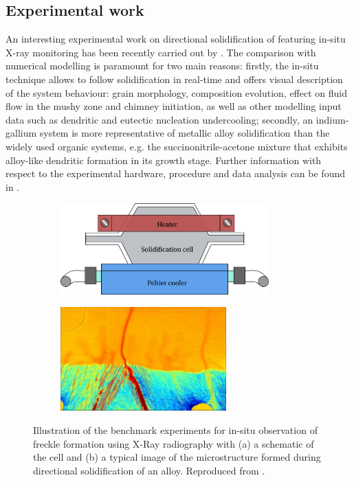\subsection{Experimental work} 
\label{sec:freckle_exp}
An interesting experimental work on directional solidification of 
featuring in-situ X-ray monitoring has been recently carried out by \citet{shevchenko_chimney_2013}. 
The comparison with numerical modelling is paramount for two main reasons: firstly, the in-situ technique allows to follow solidification in real-time 
and offers visual description of the system behaviour: grain morphology, composition evolution, effect on fluid flow in the 
mushy zone and chimney initiation, as well as other modelling input data such as dendritic and eutectic nucleation undercooling; 
secondly, an indium-gallium system is more representative of metallic alloy solidification than the widely used organic systems, 
e.g. the succinonitrile-acetone mixture that exhibits alloy-like dendritic formation in its growth stage. Further information with respect 
to the experimental hardware, procedure and data analysis can be found in \citep{boden_x-ray_2008,shevchenko_chimney_2013}.
%
\begin{figure}[htbp]
\centering
  \begin{subfigure}{0.5\textwidth}
    \centering
	\includegraphics[height=3.5cm]{Chapter3/Graphics/freckle_exp/setup.pdf}
	\caption{}
    \label{fig:experimental_setup}
  \end{subfigure}
  \begin{subfigure}{0.5\textwidth}
    \centering
	\includegraphics[height=4cm]{Chapter3/Graphics/freckle_exp/img.png}
	\caption{}
    \label{fig:experimental_img}
  \end{subfigure}
\caption{Illustration of the benchmark experiments for in-situ observation of freckle 
formation using X-Ray radiography with (a) a schematic of the cell and (b) a typical image 
of the microstructure formed during directional solidification of an  alloy. Reproduced from \citep{shevchenko_chimney_2013}.} 
\label{fig:experimental_freckles}
\end{figure}
%

